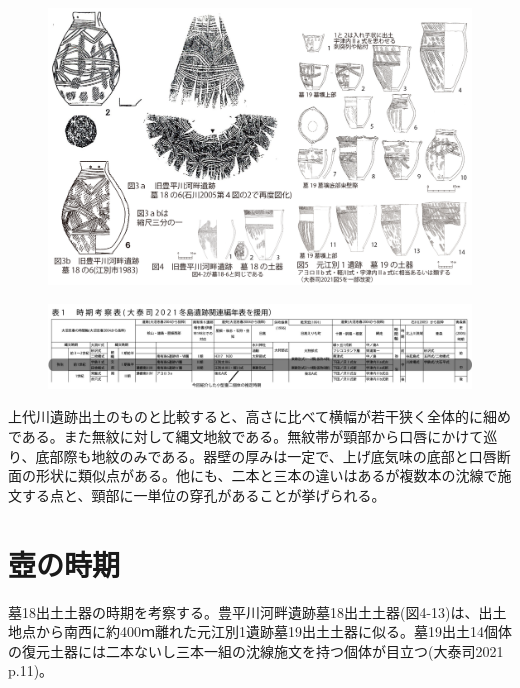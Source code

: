 \documentclass[a4j,11pt,twocolumn,openany]{jsbook}
\begin{document}
\begin{figure}[ht]
	\centering
	\includegraphics[width=160truemm]{fig/03_Otaishi/02_otaishi.jpg}
	\label{}
	\vspace{-1\baselineskip}
\end{figure}

\begin{figure}[ht]
	\centering
	\includegraphics[width=160truemm]{fig/03_Otaishi/03_otaishi.jpg}
	\label{}
	\vspace{-1\baselineskip}
\end{figure}

上代川遺跡出土のものと比較すると、高さに比べて横幅が若干狭く全体的に細めである。また無紋に対して縄文地紋である。無紋帯が頸部から口唇にかけて巡り、底部際も地紋のみである。器壁の厚みは一定で、上げ底気味の底部と口唇断面の形状に類似点がある。他にも、二本と三本の違いはあるが複数本の沈線で施文する点と、頸部に一単位の穿孔があることが挙げられる。

\section{壺の時期}
墓18出土土器の時期を考察する。豊平川河畔遺跡墓18出土土器(図4-13)は、出土地点から南西に約400ｍ離れた元江別1遺跡墓19出土土器に似る。墓19出土14個体の復元土器には二本ないし三本一組の沈線施文を持つ個体が目立つ(大泰司2021 p.11)。
\end{document}

